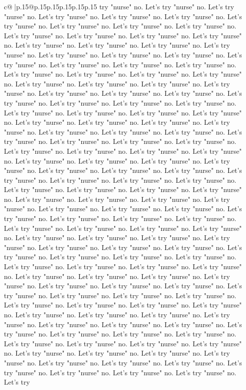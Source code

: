 \documentclass{article}
\begin{document}
{\begin{supertabular}{c@{$\;$}|p{.15\linewidth}@{}p{.15\linewidth}p{.15\linewidth}p{.15\linewidth}p{.15\linewidth}p{.15\linewidth}}
{{{try "nurse" no. Let's try "nurse" no. Let's try "nurse" no. Let's try "nurse" no. Let's try "nurse" no. Let's try "nurse" no. Let's try "nurse" no. Let's try "nurse" no. Let's try "nurse" no. Let's try "nurse" no. Let's try "nurse" no. Let's try "nurse" no. Let's try "nurse" no. Let's try "nurse" no. Let's try "nurse" no. Let's try "nurse" no. Let's try "nurse" no. Let's try "nurse" no. Let's try "nurse" no. Let's try "nurse" no. Let's try "nurse" no. Let's try "nurse" no. Let's try "nurse" no. Let's try "nurse" no. Let's try "nurse" no. Let's try "nurse" no. Let's try "nurse" no. Let's try "nurse" no. Let's try "nurse" no. Let's try "nurse" no. Let's try "nurse" no. Let's try "nurse" no. Let's try "nurse" no. Let's try "nurse" no. Let's try "nurse" no. Let's try "nurse" no. Let's try "nurse" no. Let's try "nurse" no. Let's try "nurse" no. Let's try "nurse" no. Let's try "nurse" no. Let's try "nurse" no. Let's try "nurse" no. Let's try "nurse" no. Let's try "nurse" no. Let's try "nurse" no. Let's try "nurse" no. Let's try "nurse" no. Let's try "nurse" no. Let's try "nurse" no. Let's try "nurse" no. Let's try "nurse" no. Let's try "nurse" no. Let's try "nurse" no. Let's try "nurse" no. Let's try "nurse" no. Let's try "nurse" no. Let's try "nurse" no. Let's try "nurse" no. Let's try "nurse" no. Let's try "nurse" no. Let's try "nurse" no. Let's try "nurse" no. Let's try "nurse" no. Let's try "nurse" no. Let's try "nurse" no. Let's try "nurse" no. Let's try "nurse" no. Let's try "nurse" no. Let's try "nurse" no. Let's try "nurse" no. Let's try "nurse" no. Let's try "nurse" no. Let's try "nurse" no. Let's try "nurse" no. Let's try "nurse" no. Let's try "nurse" no. Let's try "nurse" no. Let's try "nurse" no. Let's try "nurse" no. Let's try "nurse" no. Let's try "nurse" no. Let's try "nurse" no. Let's try "nurse" no. Let's try "nurse" no. Let's try "nurse" no. Let's try "nurse" no. Let's try "nurse" no. Let's try "nurse" no. Let's try "nurse" no. Let's try "nurse" no. Let's try "nurse" no. Let's try "nurse" no. Let's try "nurse" no. Let's try "nurse" no. Let's try "nurse" no. Let's try "nurse" no. Let's try "nurse" no. Let's try "nurse" no. Let's try "nurse" no. Let's try "nurse" no. Let's try "nurse" no. Let's try "nurse" no. Let's try "nurse" no. Let's try "nurse" no. Let's try "nurse" no. Let's try "nurse" no. Let's try "nurse" no. Let's try "nurse" no. Let's try "nurse" no. Let's try "nurse" no. Let's try "nurse" no. Let's try "nurse" no. Let's try "nurse" no. Let's try "nurse" no. Let's try "nurse" no. Let's try "nurse" no. Let's try "nurse" no. Let's try "nurse" no. Let's try "nurse" no. Let's try "nurse" no. Let's try "nurse" no. Let's try "nurse" no. Let's try "nurse" no. Let's try "nurse" no. Let's try "nurse" no. Let's try "nurse" no. Let's try "nurse" no. Let's try "nurse" no. Let's try "nurse" no. Let's try "nurse" no. Let's try "nurse" no. Let's try "nurse" no. Let's try "nurse" no. Let's try "nurse" no. Let's try "nurse" no. Let's try "nurse" no. Let's try "nurse" no. Let's try "nurse" no. Let's try "nurse" no. Let's try "nurse" no. Let's try "nurse" no. Let's try "nurse" no. Let's try "nurse" no. Let's try "nurse" no. Let's try }}}
\end{supertabular}}
\end{document}
